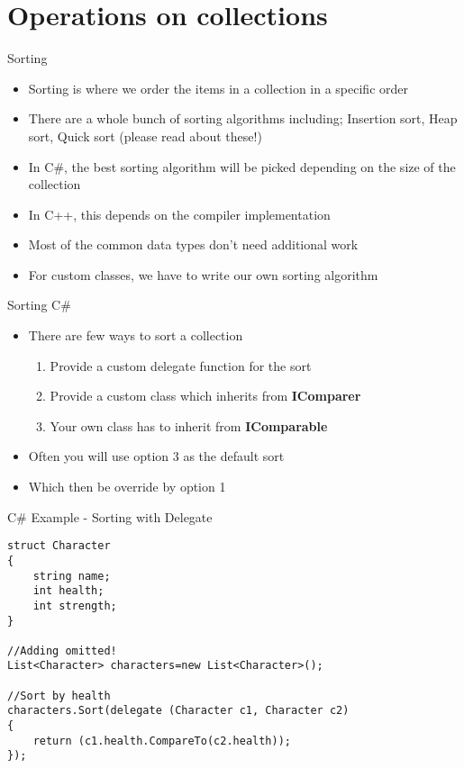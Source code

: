 \part{Operations on collections}
\frame{\partpage}

\begin{frame}{Sorting}
	\begin{itemize}
		\pause \item Sorting is where we order the items in a collection in a specific order
		\pause \item There are a whole bunch of sorting algorithms including; Insertion sort, Heap sort, Quick sort (please read about these!)
		\pause \item In C\#, the best sorting algorithm will be picked depending on the size of the collection
		\pause \item In C++, this depends on the compiler implementation 
		\pause \item Most of the common data types don't need additional work
		\pause \item For custom classes, we have to write our own sorting algorithm
	\end{itemize}
\end{frame}

\begin{frame}{Sorting C\#}
	\begin{itemize}
		\pause \item There are few ways to sort a collection
		\begin{enumerate}
			\pause \item Provide a custom delegate function for the sort
			\pause \item Provide a custom class which inherits from \textbf{IComparer}
			\pause \item Your own class has to inherit from \textbf{IComparable}
		\end{enumerate}
		\pause \item Often you will use option 3 as the default sort
		\pause \item Which then be override by option 1 
	\end{itemize}
\end{frame}

\begin{frame}[fragile]{C\# Example - Sorting with Delegate }
\begin{lstlisting}
struct Character
{
	string name;
	int health;
	int strength;
}

//Adding omitted!
List<Character> characters=new List<Character>();

//Sort by health
characters.Sort(delegate (Character c1, Character c2)
{
	return (c1.health.CompareTo(c2.health));
});
\end{lstlisting}
\end{frame}

